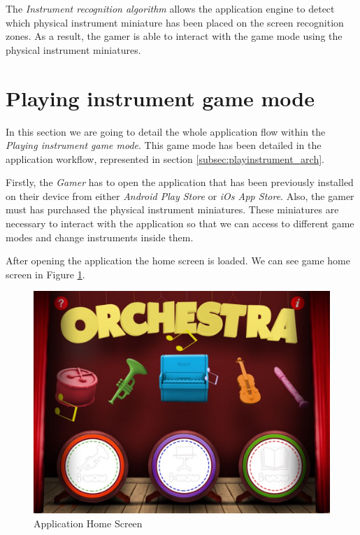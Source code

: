 The \textit{Instrument recognition algorithm} allows the application engine to detect which physical instrument miniature has been placed on the screen recognition zones. As a result, the gamer is able to interact with the game mode using the physical instrument miniatures.

\newpage
\section{Playing instrument game mode}
\label{sec:playinginstrumentgm}

In this section we are going to detail the whole application flow within the \textit{Playing instrument game mode}. This game mode has been detailed in the application workflow, represented in section \ref{subsec:playinstrument_arch}.

Firstly, the \textit{Gamer} has to open the application that has been previously installed on their device from either \textit{Android Play Store} or \textit{iOs App Store}. Also, the gamer must has purchased the physical instrument miniatures. These miniatures are necessary to interact with the application so that we can access to different game modes and change instruments inside them.

After opening the application the home screen is loaded. We can see game home screen in Figure \ref{fig:home_screen}.

\begin{figure}[ht!]
	\centering
	\includegraphics[width=400pt]{graphics/use-case/home_screen.jpg}
	\caption{Application Home Screen}
	\label{fig:home_screen}
\end{figure}

